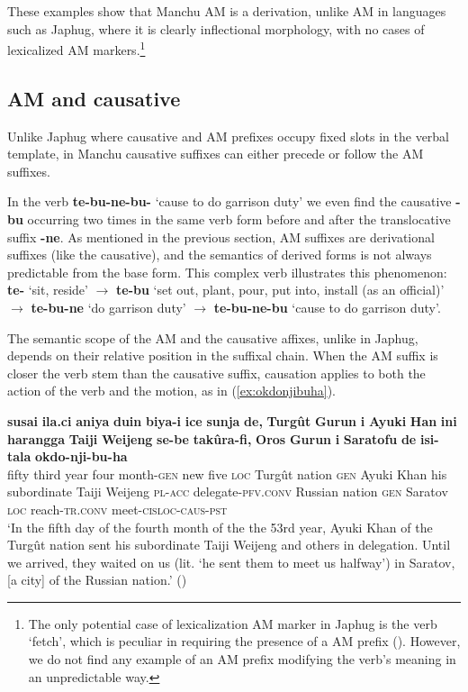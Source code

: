 \documentclass{article}
\newcommand{\ipa}[1]{\textbf{{\phon\mbox{#1}}}} %
\begin{document}
These examples show that Manchu AM is a derivation, unlike AM in languages such as Japhug, where it is clearly inflectional morphology, with no cases of lexicalized AM markers.\footnote{The only potential case of lexicalization AM marker in Japhug is the verb `fetch', which is peculiar in requiring the presence of a AM prefix (\citealt[210]{jacques13harmonization}). However, we do not find any example of an AM prefix modifying the verb's meaning in an unpredictable way.}



\subsection{AM and causative} \label{sec:manchu.caus}

Unlike Japhug where causative and AM prefixes occupy fixed slots in the verbal template, in Manchu causative suffixes can either precede or follow the AM suffixes. 

In the verb \ipa{te-bu-ne-bu-} `cause to do garrison duty' we even find the causative \ipa{-bu} occurring two times in the same verb form before and after the translocative suffix \ipa{-ne}. As mentioned in the previous section, AM suffixes are derivational suffixes (like the causative), and the semantics of derived forms is not always predictable from the base form. This complex verb illustrates this phenomenon: \ipa{te-} `sit, reside' $\rightarrow$ \ipa{te-bu} `set out, plant, pour, put into, install (as an official)' $\rightarrow$ \ipa{te-bu-ne} `do garrison duty'
$\rightarrow$ \ipa{te-bu-ne-bu} `cause to do garrison duty'.

The semantic scope of the AM and the causative affixes, unlike in Japhug, depends on their relative position in the suffixal chain. When the AM suffix is closer the verb stem than the causative suffix, causation applies to both the action of the verb and the motion, as in (\ref{ex:okdonjibuha}).

\begin{exe}
\ex \label{ex:okdonjibuha}
\gll 
\ipa{susai}	\ipa{ila.ci}	\ipa{aniya}	\ipa{duin}	\ipa{biya-i}	\ipa{ice}	\ipa{sunja}	\ipa{de,}	\ipa{Turgût}	\ipa{Gurun}	\ipa{i}	\ipa{Ayuki}	\ipa{Han}	\ipa{ini}	\ipa{harangga}	\ipa{Taiji}	\ipa{Weijeng}	\ipa{se-be}	\ipa{takûra-fi,}	\ipa{Oros}	\ipa{Gurun}	\ipa{i}	\ipa{Saratofu}	\ipa{de}	\ipa{isi-tala}	\ipa{okdo-nji-bu-ha} \\
fifty third year four month-\textsc{gen} new five \textsc{loc} Turgût nation \textsc{gen} Ayuki Khan his subordinate Taiji Weijeng \textsc{pl-acc} delegate-\textsc{pfv.conv} Russian nation \textsc{gen} Saratov \textsc{loc} reach-\textsc{tr.conv} meet-\textsc{cisloc-caus-pst} \\
\glt ‘In the fifth day of the fourth month of the the 53rd year, Ayuki Khan of the Turgût nation sent his subordinate Taiji Weijeng and others in delegation. Until we arrived,
they waited on us (lit. `he sent them to meet us halfway’) in Saratov, [a city] of the Russian nation.’ (\citealt[175;88b-89a]{shunjuu64tulishen})
\end{exe}
\end{document}
